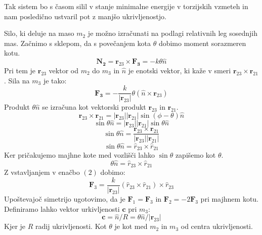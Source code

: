 \documentclass[10pt,a4paper]{article}
\begin{document}
Tak sistem bo s časom silil v stanje minimalne energije v torzijskih vzmeteh in nam posledično ustvaril pot z manjšo ukrivljenostjo.

Silo, ki deluje na maso $m_2$ je možno izračunati na podlagi relativnih leg sosednjih mas. Začnimo s sklepom, da s povečanjem kota $\theta$ dobimo moment sorazmeren kotu.
\begin{equation}
\mathbf{N_2} = \mathbf{r}_{23} \times \mathbf{F_3} = -k \theta \hat{n}
\end{equation}
Pri tem je $\mathbf{r}_{23}$ vektor od $m_2$ do $m_3$ in $\hat{n}$ je enotski vektor, ki kaže v smeri $\mathbf{r}_{23} \times \mathbf{r}_{21}$. Sila na $m_3$ je tako:
\begin{equation}
\mathbf{F_3} = -\frac{k}{|\mathbf{r}_{23}|}\theta(\hat{n} \times \mathbf{r}_{23})
\end{equation}
Produkt $\theta \hat{n}$ se izračuna kot vektorski produkt $\mathbf{r}_{23}$ in $\mathbf{r}_{21}$.
\begin{equation}
\mathbf{r}_{23} \times \mathbf{r}_{21} = |\mathbf{r}_{23}||\mathbf{r}_{21}| \sin(\phi - \theta) \hat{n}
\end{equation}
\begin{equation}
\sin\theta\hat{n} = |\mathbf{r}_{23}||\mathbf{r}_{21}|\sin\theta\hat{n}
\end{equation}
\begin{equation}
\sin\theta\hat{n} = \frac{\mathbf{r}_{23} \times \mathbf{r}_{21}}{|\mathbf{r}_{23}||\mathbf{r}_{21}|}
\end{equation}
\begin{equation} \label{eq:1}
\sin\theta\hat{n} = \hat{r}_{23} \times \hat{r}_{21}
\end{equation}
Ker pričakujemo majhne kote med vozlišči lahko $\sin\theta$ zapišemo kot $\theta$.
\begin{equation} \label{eq:2}
\theta\hat{n} = \hat{r}_{23} \times \hat{r}_{21}
\end{equation}
Z vstavljanjem v enačbo $(2)$ dobimo:
\begin{equation}
\mathbf{F}_3 = \frac{k}{|\mathbf{r}_{23}|}(\hat{r}_{23} \times \hat{r}_{21}) \times \hat{r}_{23}
\end{equation}
Upoštevajoč simetrijo ugotovimo, da je $\mathbf{F}_1 = \mathbf{F}_3$ in $\mathbf{F}_2 = -2\mathbf{F}_3$ pri majhnem kotu. Definiramo lahko vektor urkivljenosti $\mathbf{c}$ pri $m_3$:
\begin{equation}
\mathbf{c} = \hat{n}/R = \theta \hat{n} / |\mathbf{r}_{23}|
\end{equation}
Kjer je $R$ radij ukrivljenosti. Kot $\theta$ je kot med $m_2$ in $m_3$ od centra ukrivljenosti.
\end{document}
